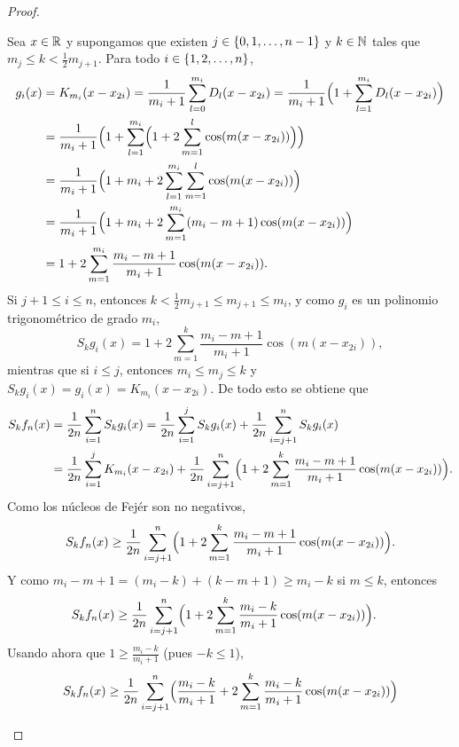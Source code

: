 \documentclass[a4paper, 12pt]{book}
\begin{document}
\begin{proof}
\begin{itemize}
        Sea $x \in \mathbb R$ y supongamos que existen $j \in \{0,1,\mathellipsis,n-1\}$ y $k \in \mathbb N$ tales que $m_j \leq k < \frac{1}{2}m_{j+1}$. Para todo $i \in \{1,2,\mathellipsis,n\}$,
        \begin{align*}
            g_i(x) &= K_{m_i}(x-x_{2i}) = \frac{1}{m_i+1}\sum_{l=0}^{m_i}D_l(x-x_{2i}) = \frac{1}{m_i+1}\Bigl(1+\sum_{l=1}^{m_i}D_l(x-x_{2i})\Bigr)  \\
            &= \frac{1}{m_i+1}\Bigl(1+\sum_{l=1}^{m_i}\Bigl(1+2\sum_{m=1}^l \cos(m(x-x_{2i}))\Bigr)\Bigr) \\
            &= \frac{1}{m_i+1}\Bigl(1+m_i+2\sum_{l=1}^{m_i}\sum_{m=1}^l \cos(m(x-x_{2i}))\Bigr) \\
            &= \frac{1}{m_i+1}\Bigl(1+m_i+2\sum_{m=1}^{m_i}(m_i-m+1)\cos(m(x-x_{2i}))\Bigr) \\
            &= 1+2\sum_{m=1}^{m_i}\frac{m_i-m+1}{m_i+1}\cos(m(x-x_{2i})).
        \end{align*}
        Si $j+1 \leq i \leq n$, entonces $k < \frac{1}{2}m_{j+1} \leq m_{j+1} \leq m_i$, y como $g_i$ es un polinomio trigonométrico de grado $m_i$,
        \[S_{k}g_i(x) = 1+2\sum_{m=1}^{k}\frac{m_i-m+1}{m_i+1}\cos(m(x-x_{2i})),\]
        mientras que si $i \leq j$, entonces $m_i \leq m_{j} \leq k$ y $S_{k}g_i(x) = g_i(x) = K_{m_i}(x-x_{2i})$. De todo esto se obtiene que
        \begin{align*}
            S_{k}f_n(x) &= \frac{1}{2n}\sum_{i=1}^n S_{k}g_i(x) =  \frac{1}{2n}\sum_{i=1}^j S_{k}g_i(x)+ \frac{1}{2n}\sum_{i=j+1}^n S_{k}g_i(x)\\
            &= \frac{1}{2n}\sum_{i=1}^jK_{m_i}(x-x_{2i})+\frac{1}{2n}\sum_{i=j+1}^n \Bigl(1+2\sum_{m=1}^{k}\frac{m_i-m+1}{m_i+1}\cos(m(x-x_{2i}))\Bigr).
        \end{align*}
        Como los núcleos de Fejér son no negativos,
        \begin{align*}
            S_{k}f_n(x) \geq \frac{1}{2n}\sum_{i=j+1}^n \Bigl(1+2\sum_{m=1}^{k}\frac{m_i-m+1}{m_i+1}\cos(m(x-x_{2i}))\Bigr).
        \end{align*}
        Y como $m_i-m+1 = (m_i-k)+(k-m+1) \geq m_i-k$ si $m \leq k$, entonces
        \begin{align*}
            S_{k}f_n(x) &\geq \frac{1}{2n}\sum_{i=j+1}^n \Bigl(1+2\sum_{m=1}^{k}\frac{m_i-k}{m_i+1}\cos(m(x-x_{2i}))\Bigr).
        \end{align*}
        Usando ahora que $1 \geq \frac{m_i-k}{m_i+1}$ (pues $-k \leq 1$),
        \begin{align*}
            S_{k}f_n(x) &\geq \frac{1}{2n}\sum_{i=j+1}^n \Bigl(\frac{m_i-k}{m_i+1}+2\sum_{m=1}^{k}\frac{m_i-k}{m_i+1}\cos(m(x-x_{2i}))\Bigr) \\

\end{align*}
\end{itemize}
\end{proof}
\end{document}
